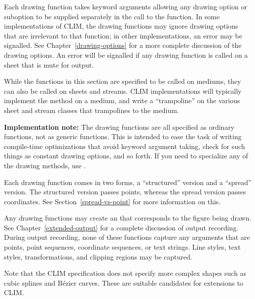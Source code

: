 \def\DrawingOptions{ink clipping-region transformation\ }
\def\PointOptions{line-style line-thickness line-unit}
\def\LineCapOptions{line-style line-thickness line-unit line-dashes line-cap-shape\ }
\def\LineJointOptions{line-style line-thickness line-unit line-dashes line-joint-shape}
\def\LineJointCapOptions{line-style line-thickness line-unit line-dashes line-joint-shape line-cap-shape}
\def\TextOptions{text-style text-family text-face text-size}

Each drawing function takes keyword arguments allowing any drawing option or
suboption to be supplied separately in the call to the function.  In some
implementations of CLIM, the drawing functions may ignore drawing options that
are irrelevant to that function; in other implementations, an error may be
signalled.  See Chapter~\ref{drawing-options} for a more complete discussion of
the drawing options.  An error will be signalled if any drawing function is
called on a sheet that is mute for output.

While the functions in this section are specified to be called on mediums, they
can also be called on sheets and streams.  CLIM implementations will typically
implement the method on a medium, and write a ``trampoline'' on the various
sheet and stream classes that trampolines to the medium.

{\bf Implementation note:} The drawing functions are all specified as ordinary
functions, not as generic functions.  This is intended to ease the task of
writing compile-time optimizations that avoid keyword argument taking, check for
such things as constant drawing options, and so forth.  If you need to
specialize any of the drawing methods, use .

Each drawing function comes in two forms, a ``structured'' version and a
``spread'' version.  The structured version passes points, whereas the spread
version passes coordinates.  See Section~\ref{spread-vs-point} for more
information on this.

Any drawing functions may create an  that corresponds to the
figure being drawn.  See Chapter~\ref{extended-output} for a complete discussion
of output recording.  During output recording, none of these functions capture
any arguments that are points, point sequences, coordinate sequences, or text
strings.  Line styles, text styles, transformations, and clipping regions may be
captured.

Note that the CLIM specification does not specify more complex shapes such as
cubic splines and B\'{e}zier curves.  These are suitable candidates for
extensions to CLIM.



